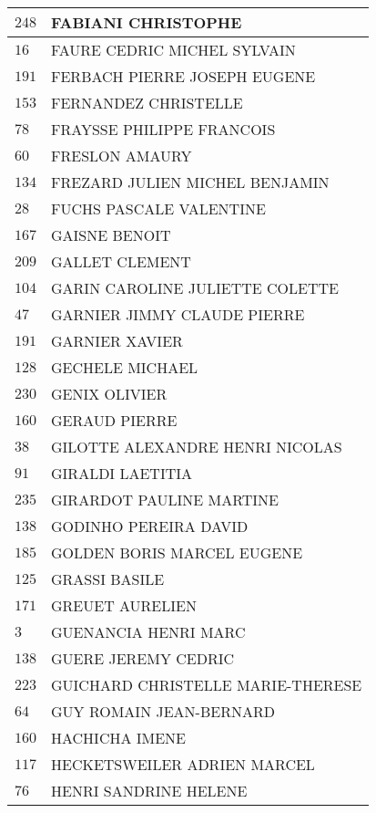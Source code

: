 \begin{xltabular}{\linewidth}{|l|X|}
    $248$ & FABIANI CHRISTOPHE \\
    \hline
    $16$ & FAURE CEDRIC MICHEL SYLVAIN \\
    \hline
    $191$ & FERBACH PIERRE JOSEPH EUGENE \\
    \hline
    $153$ & FERNANDEZ CHRISTELLE \\
    \hline
    $78$ & FRAYSSE PHILIPPE FRANCOIS \\
    \hline
    $60$ & FRESLON AMAURY \\
    \hline
    $134$ & FREZARD JULIEN MICHEL BENJAMIN \\
    \hline
    $28$ & FUCHS PASCALE VALENTINE \\
    \hline
    $167$ & GAISNE BENOIT \\
    \hline
    $209$ & GALLET CLEMENT \\
    \hline
    $104$ & GARIN CAROLINE JULIETTE COLETTE \\
    \hline
    $47$ & GARNIER JIMMY CLAUDE PIERRE \\
    \hline
    $191$ & GARNIER XAVIER \\
    \hline
    $128$ & GECHELE MICHAEL \\
    \hline
    $230$ & GENIX OLIVIER \\
    \hline
    $160$ & GERAUD PIERRE \\
    \hline
    $38$ & GILOTTE ALEXANDRE HENRI NICOLAS \\
    \hline
    $91$ & GIRALDI LAETITIA \\
    \hline
    $235$ & GIRARDOT PAULINE MARTINE \\
    \hline
    $138$ & GODINHO PEREIRA DAVID \\
    \hline
    $185$ & GOLDEN BORIS MARCEL EUGENE \\
    \hline
    $125$ & GRASSI BASILE \\
    \hline
    $171$ & GREUET AURELIEN \\
    \hline
    $3$ & GUENANCIA HENRI MARC \\
    \hline
    $138$ & GUERE JEREMY CEDRIC \\
    \hline
    $223$ & GUICHARD CHRISTELLE MARIE-THERESE \\
    \hline
    $64$ & GUY ROMAIN JEAN-BERNARD \\
    \hline
    $160$ & HACHICHA IMENE \\
    \hline
    $117$ & HECKETSWEILER ADRIEN MARCEL \\
    \hline
    $76$ & HENRI SANDRINE HELENE \\

\end{xltabular}
